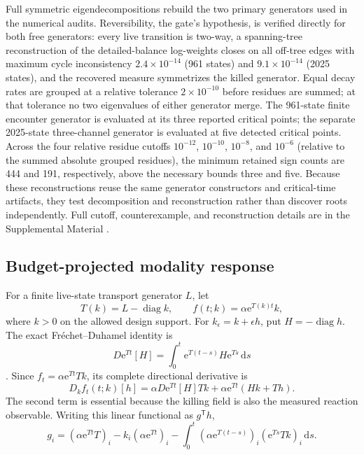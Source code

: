 \documentclass[aps,pre,reprint,amsmath,amssymb,longbibliography,floatfix]{revtex4-2}
\newcommand{\dd}{\mathrm d}
\newcommand{\e}{\mathrm e}
\begin{document}
Full symmetric eigendecompositions rebuild the two primary generators used in
the numerical audits. Reversibility, the gate's hypothesis, is verified
directly for both free generators: every live transition is two-way, a
spanning-tree reconstruction of the detailed-balance log-weights closes on
all off-tree edges with maximum cycle inconsistency \(2.4\times10^{-14}\)
(961 states) and \(9.1\times10^{-14}\) (2025 states), and the recovered
measure symmetrizes the killed generator. Equal decay rates are grouped at a
relative tolerance \(2\times10^{-10}\) before residues are summed; at that
tolerance no two eigenvalues of either generator merge. The 961-state finite
encounter generator is evaluated
at its three reported critical points; the separate 2025-state
three-channel generator is evaluated at five detected critical
points. Across the four relative residue cutoffs \(10^{-12}\), \(10^{-10}\),
\(10^{-8}\), and \(10^{-6}\) (relative to the summed absolute grouped
residues), the
minimum retained sign counts are 444 and 191, respectively, above the
necessary bounds three and five. Because these reconstructions reuse the
same generator constructors and critical-time artifacts, they test decomposition
and reconstruction rather than discover roots independently. Full cutoff,
counterexample, and reconstruction details are in the Supplemental Material
\cite{supplementalMaterial}.

\subsection{Budget-projected modality response}
\label{sec:budget-gradient}

For a finite live-state transport generator \(L\), let
\begin{equation}
T(k)=L-\operatorname{diag}k,\qquad
f(t;k)=\alpha\e^{T(k)t}k,
\label{eq:killing-design-model}
\end{equation}
where \(k>0\) on the allowed design support. For
\(k_\epsilon=k+\epsilon h\), put \(H=-\operatorname{diag}h\). The exact
Fr\'echet--Duhamel identity is
\begin{equation}
D\e^{Tt}[H]=\int_0^t\e^{T(t-s)}H\e^{Ts}\,\dd s
\label{eq:design-duhamel}
\end{equation}
\cite{alMohyHigham2009frechet}. Since
\(f_t=\alpha\e^{Tt}Tk\), its complete directional derivative is
\begin{equation}
D_kf_t(t;k)[h]
=\alpha D\e^{Tt}[H]Tk+\alpha\e^{Tt}(Hk+Th).
\label{eq:modality-susceptibility}
\end{equation}
The second term is essential because the killing field is also the measured
reaction observable. Writing this linear functional as \(g^\mathsf Th\),
\begin{equation}
g_i=(\alpha\e^{Tt}T)_i-k_i(\alpha\e^{Tt})_i
-\int_0^t(\alpha\e^{T(t-s)})_i(\e^{Ts}Tk)_i\,\dd s.
\label{eq:modality-gradient}
\end{equation}
\end{document}
